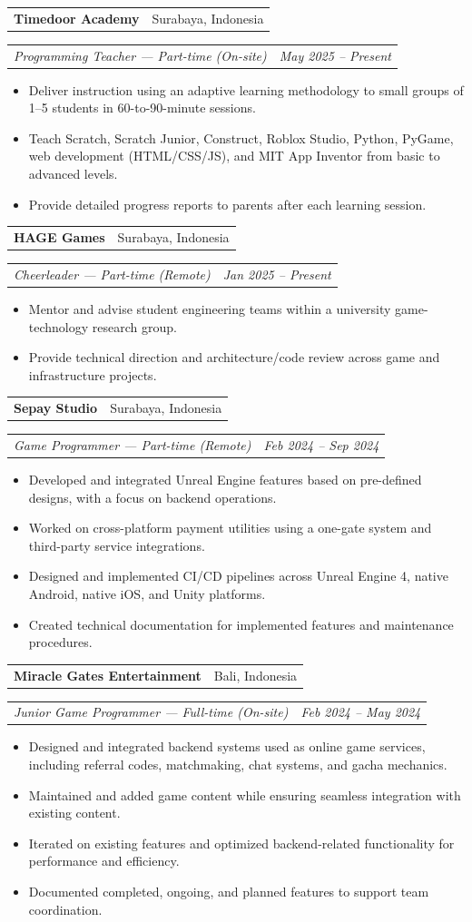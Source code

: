 \documentclass[10pt,a4paper]{article}
\makeatletter
\newcommand{\company}[2]{%
  \vspace{0.28em}%
  \begin{tabularx}{\textwidth}{@{}Xr@{}}
    \textbf{#1} & \textcolor{muted}{#2}
  \end{tabularx}\vspace{-0.45em}
}
\newcommand{\role}[2]{%
  \begin{tabularx}{\textwidth}{@{}Xr@{}}
    \textit{#1} & \textit{#2}
  \end{tabularx}\vspace{-0.55em}
}
\makeatother
\begin{document}
\company{Timedoor Academy}{Surabaya, Indonesia}
\role{Programming Teacher --- Part-time (On-site)}{May 2025 -- Present}
\begin{itemize}
  \item Deliver instruction using an adaptive learning methodology to small groups of 1--5 students in 60-to-90-minute sessions.
  \item Teach Scratch, Scratch Junior, Construct, Roblox Studio, Python, PyGame, web development (HTML/CSS/JS), and MIT App Inventor from basic to advanced levels.
  \item Provide detailed progress reports to parents after each learning session.
\end{itemize}

\company{HAGE Games}{Surabaya, Indonesia}
\role{Cheerleader --- Part-time (Remote)}{Jan 2025 -- Present}
\begin{itemize}
  \item Mentor and advise student engineering teams within a university game-technology research group.
  \item Provide technical direction and architecture/code review across game and infrastructure projects.
\end{itemize}

\company{Sepay Studio}{Surabaya, Indonesia}
\role{Game Programmer --- Part-time (Remote)}{Feb 2024 -- Sep 2024}
\begin{itemize}
  \item Developed and integrated Unreal Engine features based on pre-defined designs, with a focus on backend operations.
  \item Worked on cross-platform payment utilities using a one-gate system and third-party service integrations.
  \item Designed and implemented CI/CD pipelines across Unreal Engine 4, native Android, native iOS, and Unity platforms.
  \item Created technical documentation for implemented features and maintenance procedures.
\end{itemize}

\company{Miracle Gates Entertainment}{Bali, Indonesia}
\role{Junior Game Programmer --- Full-time (On-site)}{Feb 2024 -- May 2024}
\begin{itemize}
  \item Designed and integrated backend systems used as online game services, including referral codes, matchmaking, chat systems, and gacha mechanics.
  \item Maintained and added game content while ensuring seamless integration with existing content.
  \item Iterated on existing features and optimized backend-related functionality for performance and efficiency.
  \item Documented completed, ongoing, and planned features to support team coordination.
\end{itemize}
\end{document}
